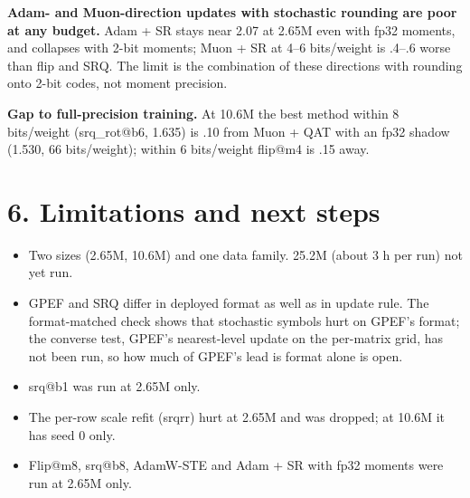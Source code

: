 \documentclass[11pt,letterpaper]{article}
\begin{document}
\textbf{Adam- and Muon-direction updates with stochastic rounding are poor at any budget.} Adam + SR stays near 2.07
at 2.65M even with fp32 moments, and collapses with 2-bit moments; Muon + SR at 4--6 bits/weight is .4--.6 worse
than flip and SRQ. The limit is the combination of these directions with rounding onto 2-bit codes, not moment
precision.

\textbf{Gap to full-precision training.} At 10.6M the best method within 8 bits/weight (srq\_rot@b6, 1.635) is .10
from Muon + QAT with an fp32 shadow (1.530, 66 bits/weight); within 6 bits/weight flip@m4 is .15 away.

\section*{6. Limitations and next steps}

\begin{itemize}\setlength\itemsep{2pt}
\item Two sizes (2.65M, 10.6M) and one data family. 25.2M (about 3 h per run) not yet run.
\item GPEF and SRQ differ in deployed format as well as in update rule. The format-matched check shows that
  stochastic symbols hurt on GPEF's format; the converse test, GPEF's nearest-level update on the per-matrix grid,
  has not been run, so how much of GPEF's lead is format alone is open.
\item srq@b1 was run at 2.65M only.
\item The per-row scale refit (srqrr) hurt at 2.65M and was dropped; at 10.6M it has seed 0 only.
\item Flip@m8, srq@b8, AdamW-STE and Adam + SR with fp32 moments were run at 2.65M only.
\end{itemize}
\end{document}
